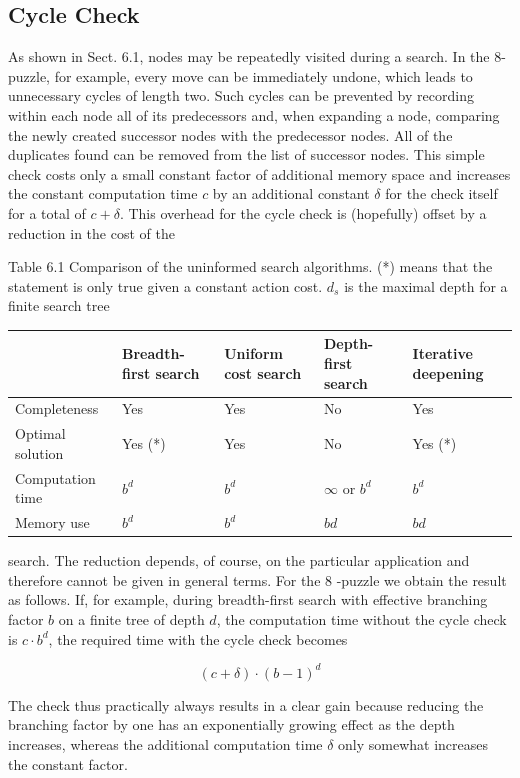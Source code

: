 \documentclass[10pt]{book}
\begin{document}
\subsection{Cycle Check}
As shown in Sect. 6.1, nodes may be repeatedly visited during a search. In the 8-puzzle, for example, every move can be immediately undone, which leads to unnecessary cycles of length two. Such cycles can be prevented by recording within each node all of its predecessors and, when expanding a node, comparing the newly created successor nodes with the predecessor nodes. All of the duplicates found can be removed from the list of successor nodes. This simple check costs only a small constant factor of additional memory space and increases the constant computation time $c$ by an additional constant $\delta$ for the check itself for a total of $c+\delta$. This overhead for the cycle check is (hopefully) offset by a reduction in the cost of the

Table 6.1 Comparison of the uninformed search algorithms. (*) means that the statement is only true given a constant action cost. $d_{s}$ is the maximal depth for a finite search tree

\begin{center}
\begin{tabular}{|l|l|l|l|l|}
\hline
 & Breadth-first search & Uniform cost search & Depth-first search & Iterative deepening \\
\hline
Completeness & Yes & Yes & No & Yes \\
\hline
Optimal solution & Yes (*) & Yes & No & Yes (*) \\
\hline
Computation time & $b^{d}$ & $b^{d}$ & $\infty$ or $b^{d}$ & $b^{d}$ \\
\hline
Memory use & $b^{d}$ & $b^{d}$ & $bd$ & $bd$ \\
\hline
\end{tabular}
\end{center}

search. The reduction depends, of course, on the particular application and therefore cannot be given in general terms.
For the 8 -puzzle we obtain the result as follows. If, for example, during breadth-first search with effective branching factor $b$ on a finite tree of depth $d$, the computation time without the cycle check is $c \cdot b^{d}$, the required time with the cycle check becomes

$$
(c+\delta) \cdot(b-1)^{d}
$$

The check thus practically always results in a clear gain because reducing the branching factor by one has an exponentially growing effect as the depth increases, whereas the additional computation time $\delta$ only somewhat increases the constant factor.
\end{document}
